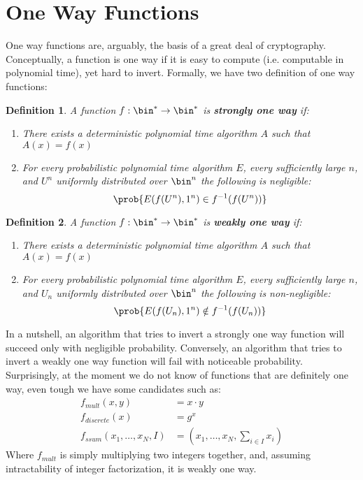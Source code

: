 \documentclass{article}
\newtheorem{definition}{Definition}
\begin{document}
\appendix
\section{One Way Functions}
One way functions are, arguably, the basis of a great deal of cryptography.
Conceptually, a function is one way if it is easy to compute (i.e. computable in polynomial time), yet hard to invert.
Formally, we have two definition of one way functions:
\begin{definition}
    A function $f: \bin^* \to \bin^*$ is \textbf{strongly one way} if:
    \begin{enumerate}
        \item There exists a deterministic polynomial time algorithm $A$ such that $A(x) = f(x)$
        \item For every probabilistic polynomial time algorithm $E$, every sufficiently large $n$, and $U^n$ uniformly distributed over $\bin^n$ the following is negligible:
            \[ \prob{E(f(U^n), 1^n) \in f^{-1}(f(U^n))  } \]
    \end{enumerate}
\end{definition}
\begin{definition}
    A function $f: \bin^* \to \bin^*$ is \textbf{weakly one way} if:
    \begin{enumerate}
        \item There exists a deterministic polynomial time algorithm $A$ such that $A(x) = f(x)$
        \item For every probabilistic polynomial time algorithm $E$, every sufficiently large $n$, and $U_n$ uniformly distributed over $\bin^n$ the following is non-negligible:
            \[ \prob{E(f(U_n), 1^n) \notin f^{-1}(f(U_n))  } \]
    \end{enumerate}
\end{definition}
In a nutshell, an algorithm that tries to invert a strongly one way function will succeed only with negligible probability.
Conversely, an algorithm that tries to invert a weakly one way function will fail with noticeable probability.
Surprisingly, at the moment we do not know of functions that are definitely one way, even tough we have some candidates such as:
\begin{align*}
    f_{mult}(x,y) &=  x \cdot y \\
    f_{discrete}(x) &= g^x \\
    f_{ssum}(x_1, \dots, x_N, I) &= (x_1, \dots, x_N, \sum_{i \in I} x_i)
\end{align*}
Where $f_{mult}$ is simply multiplying two integers together, and, assuming intractability of integer factorization, it is weakly one way.
\end{document}
